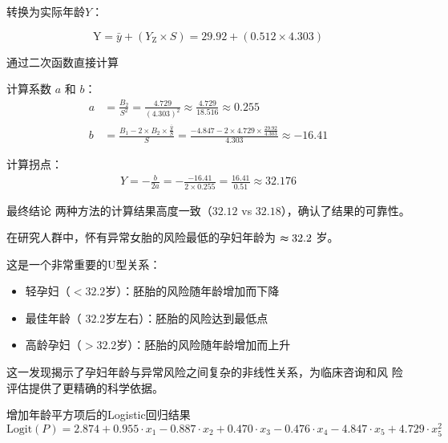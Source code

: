 \documentclass[withoutpreface,notoc]{cumcmthesis}
\begin{document}
	转换为实际年龄$Y$：

	\begin{equation}
	\text{Y} = \bar{y} + (Y_{\text{Z}} \times S) = 29.92 + (0.512 \times 4.303)
	\end{equation}

	通过二次函数直接计算

	计算系数 $a$ 和 $b$：
	\begin{align}
	a &= \frac{B_2}{S^2} = \frac{4.729}{(4.303)^2} \approx \frac{4.729}{18.516} \approx 0.255 \\
	b &= \frac{B_1 - 2 \times B_2 \times \frac{\bar{y}}{S}}{S} = \frac{-4.847 - 2 \times 4.729 \times \frac{29.92}{4.303}}{4.303} \approx -16.41
	\end{align}

	计算拐点：
	\begin{align}
	Y = -\frac{b}{2a} = -\frac{-16.41}{2 \times 0.255} = \frac{16.41}{0.51} \approx 32.176
	\end{align}

	最终结论
	两种方法的计算结果高度一致（$32.12$ vs $32.18$），确认了结果的可靠性。

	在研究人群中，怀有异常女胎的风险最低的孕妇年龄为  $\thickapprox 32.2$ 岁。

	这是一个非常重要的U型关系：

	\begin{itemize}
	\item 轻孕妇（$<32.2$岁）：胚胎的风险随年龄增加而下降
	\item 最佳年龄（ $32.2$岁左右）：胚胎的风险达到最低点
	\item 高龄孕妇（$>32.2$岁）：胚胎的风险随年龄增加而上升
	\end{itemize}

	这一发现揭示了孕妇年龄与异常风险之间复杂的非线性关系，为临床咨询和风
	险评估提供了更精确的科学依据。

	增加年龄平方项后的Logistic回归结果
	\begin{equation*}
	\label{logit2}
	\text{Logit}(P) = 2.874 + 0.955 \cdot x_{1} - 0.887 \cdot x_{2} + 0.470 \cdot x_{3} - 0.476 \cdot x_{4} - 4.847 \cdot x_{5} +4.729 \cdot x^{2}_{5}
	\end{equation*}
\end{document}

